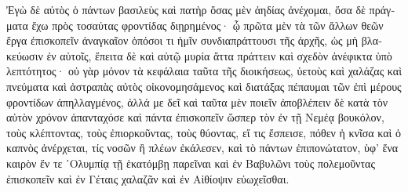 {\large
\begin{greek}
\noindent Ἐγὼ δὲ αὐτὸς ὁ πάντων βασιλεὺς καὶ πατὴρ ὅσας μὲν ἀηδίας ἀνέχομαι, ὅσα δὲ πράγματα ἔχω πρὸς τοσαύτας φροντίδας διῃρημένος· ᾧ πρῶτα μὲν τὰ τῶν ἄλλων θεῶν ἔργα ἐπισκοπεῖν ἀναγκαῖον ὁπόσοι τι ἡμῖν συνδιαπράττουσι τῆς ἀρχῆς, ὡς μὴ βλακεύωσιν ἐν αὐτοῖς, ἔπειτα δὲ καὶ αὐτῷ μυρία ἄττα πράττειν καὶ σχεδὸν ἀνέφικτα ὑπὸ λεπτότητος· οὐ γὰρ μόνον τὰ κεφάλαια ταῦτα τῆς  διοικήσεως, ὑετοὺς καὶ χαλάζας καὶ πνεύματα καὶ ἀστραπὰς αὐτὸς οἰκονομησάμενος καὶ διατάξας πέπαυμαι τῶν ἐπὶ μέρους φροντίδων ἀπηλλαγμένος, ἀλλά με δεῖ καὶ ταῦτα μὲν ποιεῖν ἀποβλέπειν δὲ κατὰ τὸν αὐτὸν χρόνον ἁπανταχόσε καὶ πάντα ἐπισκοπεῖν ὥσπερ τὸν ἐν τῇ Νεμέᾳ βουκόλον, τοὺς κλέπτοντας, τοὺς ἐπιορκοῦντας, τοὺς θύοντας, εἴ τις ἔσπεισε, πόθεν ἡ κνῖσα καὶ ὁ καπνὸς ἀνέρχεται, τίς νοσῶν ἢ πλέων ἐκάλεσεν, καὶ τὸ πάντων ἐπιπονώτατον, ὑφ' ἕνα καιρὸν ἔν τε ᾿Ολυμπίᾳ τῇ ἑκατόμβῃ παρεῖναι καὶ ἐν Βαβυλῶνι τοὺς πολεμοῦντας ἐπισκοπεῖν καὶ ἐν Γέταις χαλαζᾶν καὶ ἐν Αἰθίοψιν εὐωχεῖσθαι.

\end{greek}

}

